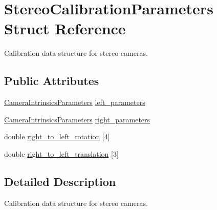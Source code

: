 \hypertarget{structfovis_1_1StereoCalibrationParameters}{
\section{StereoCalibrationParameters Struct Reference}
\label{structfovis_1_1StereoCalibrationParameters}
}


Calibration data structure for stereo cameras.  


\subsection*{Public Attributes}
\begin{DoxyCompactItemize}
\item 
\hyperlink{structfovis_1_1CameraIntrinsicsParameters}{CameraIntrinsicsParameters} \hyperlink{structfovis_1_1StereoCalibrationParameters_ae2daad4ea93156558a55f3fa9a9d26e4}{left\_\-parameters}
\item 
\hyperlink{structfovis_1_1CameraIntrinsicsParameters}{CameraIntrinsicsParameters} \hyperlink{structfovis_1_1StereoCalibrationParameters_a873ffca7c3cd68f861b010bc7843e219}{right\_\-parameters}
\item 
double \hyperlink{structfovis_1_1StereoCalibrationParameters_ab3132502bb9c8258759a94659881e80c}{right\_\-to\_\-left\_\-rotation} \mbox{[}4\mbox{]}
\item 
double \hyperlink{structfovis_1_1StereoCalibrationParameters_adc32536cfff16a5a429ee922055e91c7}{right\_\-to\_\-left\_\-translation} \mbox{[}3\mbox{]}
\end{DoxyCompactItemize}


\subsection{Detailed Description}
Calibration data structure for stereo cameras. 

